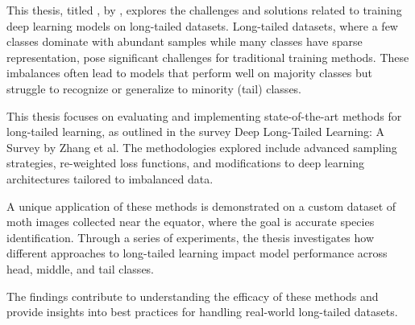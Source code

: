 This thesis, titled \textit{\ThesisTitle}, by \AuthorName, explores the challenges and solutions related to training deep learning models on long-tailed datasets. Long-tailed datasets, where a few classes dominate with abundant samples while many classes have sparse representation, pose significant challenges for traditional training methods. These imbalances often lead to models that perform well on majority classes but struggle to recognize or generalize to minority (tail) classes.

This thesis focuses on evaluating and implementing state-of-the-art methods for long-tailed learning, as outlined in the survey Deep Long-Tailed Learning: A Survey by Zhang et al. The methodologies explored include advanced sampling strategies, re-weighted loss functions, and modifications to deep learning architectures tailored to imbalanced data.

A unique application of these methods is demonstrated on a custom dataset of moth images collected near the equator, where the goal is accurate species identification. Through a series of experiments, the thesis investigates how different approaches to long-tailed learning impact model performance across head, middle, and tail classes.

The findings contribute to understanding the efficacy of these methods and provide insights into best practices for handling real-world long-tailed datasets.